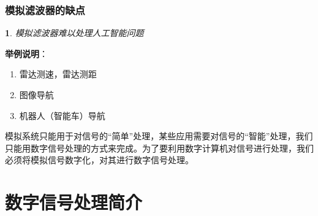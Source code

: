 \documentclass[notheorems,compress,mathserif,table]{beamer}
\newtheorem{dablock}{}
\begin{document}
%
%
%
%
%
%
\begin{frame}[shrink]\frametitle{模拟滤波器的缺点}%
\begin{dablock}

模拟滤波器难以处理人工智能问题



\end{dablock}
    \textbf{举例说明}：
    \begin{enumerate}
      \item 雷达测速，雷达测距
      \item 图像导航
      \item 机器人（智能车）导航
    \end{enumerate}


     模拟系统只能用于对信号的“简单”处理，某些应用需要对信号的“智能”处理，我们只能用数字信号处理的方式来完成。为了要利用数字计算机对信号进行处理，我们必须将模拟信号数字化，对其进行数字信号处理。
\end{frame}
%
%
%
%
%
%
\section{数字信号处理简介}
\end{document}
